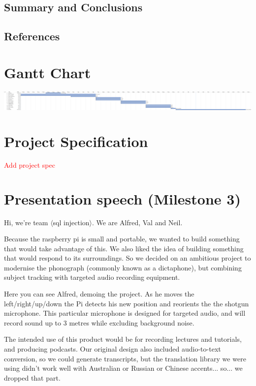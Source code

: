 \documentclass[11pt,a4paper,titlepage]{report}
\begin{document}
\section{Summary and Conclusions}
\section{References}



\begin{appendices}

\chapter{Gantt Chart}

\includegraphics[width=\textwidth]{graphs/gantt-chart.pdf}


\chapter{Project Specification }

\textcolor{red}{Add project spec}

\chapter{Presentation speech (Milestone 3)}


Hi, we're team $\langle$sql injection$\rangle$. We are Alfred, Val and Neil.

Because the raspberry pi is small and portable, we wanted to build something that would take advantage of this. We also liked the idea of building something that would respond to its surroundings. So we decided on an ambitious project to modernise the phonograph (commonly known as a dictaphone), but combining subject tracking with targeted audio recording equipment.

Here you can see Alfred, demoing the project. As he moves the left/right/up/down the Pi detects his new position and reorients the the shotgun microphone. This particular microphone is designed for targeted audio, and will record sound up to 3 metres while excluding background noise. 

The intended use of this product would be for recording lectures and tutorials, and producing podcasts. Our original design also included audio-to-text conversion, so we could generate transcripts, but the translation library we were using didn’t work well with Australian or Russian or Chinese accents... so... we dropped that part.


\end{appendices}
\end{document}
